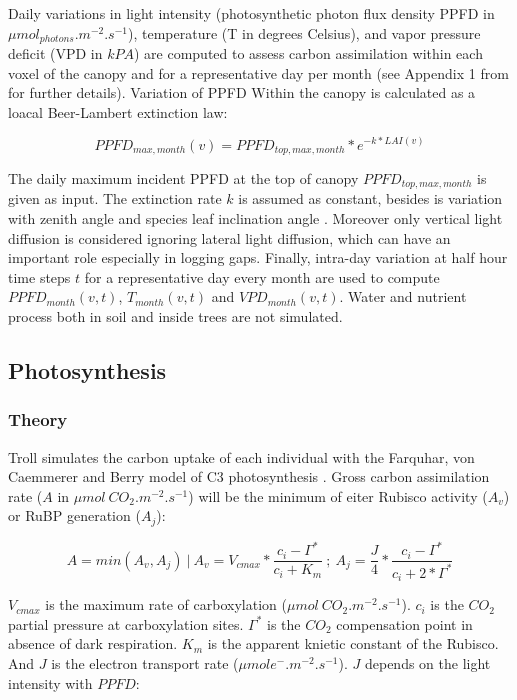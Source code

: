 \documentclass[12pt,]{article}
\theoremstyle{definition}
\theoremstyle{definition}
\theoremstyle{remark}
\begin{document}
Daily variations in light intensity (photosynthetic photon flux density
PPFD in \(\mu mol_{photons}.m^{-2}.s^{-1}\)), temperature (T in degrees
Celsius), and vapor pressure deficit (VPD in \(kPA\)) are computed to
assess carbon assimilation within each voxel of the canopy and for a
representative day per month (see Appendix 1 from \citet{Li} for further
details). Variation of PPFD Within the canopy is calculated as a loacal
Beer-Lambert extinction law:

\begin{equation}
  PPFD_{max,month}(v) = PPFD_{top,max,month}*e^{-k*LAI(v)}
  \label{eq:PPFD}
\end{equation}

The daily maximum incident PPFD at the top of canopy
\(PPFD_{top,max,month}\) is given as input. The extinction rate \(k\) is
assumed as constant, besides is variation with zenith angle and species
leaf inclination angle \citep{Meir2000}. Moreover only vertical light
diffusion is considered ignoring lateral light diffusion, which can have
an important role especially in logging gaps. Finally, intra-day
variation at half hour time steps \(t\) for a representative day every
month are used to compute \(PPFD_{month}(v,t)\), \(T_{month}(v,t)\) and
\(VPD_{month}(v,t)\). Water and nutrient process both in soil and inside
trees are not simulated.

\subsection{Photosynthesis}\label{photosynthesis}

\subsubsection{Theory}\label{theory}

Troll simulates the carbon uptake of each individual with the Farquhar,
von Caemmerer and Berry model of C3 photosynthesis \citep{Farquhar1980}.
Gross carbon assimilation rate (\(A\) in
\(\mu mol~CO_2. m^{-2}.s^{-1}\)) will be the minimum of eiter Rubisco
activity (\(A_v\)) or RuBP generation (\(A_j\)):

\begin{equation}
  A=min(A_v, A_j)~|~A_v=V_{cmax}*\frac{c_i-\Gamma^*}{c_i+K_m}~;~A_j=\frac{J}{4}*\frac{c_i-\Gamma^*}{c_i+2*\Gamma^*}
  \label{eq:A}
\end{equation}

\(V_{cmax}\) is the maximum rate of carboxylation
(\(\mu mol~CO_2.m^{-2}.s^{-1}\)). \(c_i\) is the \(CO_2\) partial
pressure at carboxylation sites. \(\Gamma^*\) is the \(CO_2\)
compensation point in absence of dark respiration. \(K_m\) is the
apparent knietic constant of the Rubisco. And \(J\) is the electron
transport rate (\(\mu mol e^-.m^{-2}.s^{-1}\)). \(J\) depends on the
light intensity with \(PPFD\):
\end{document}
